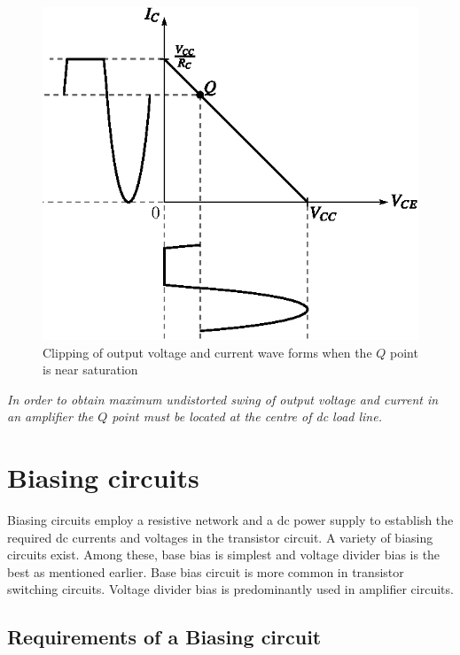 \begin{figure}[H]
\centering
\includegraphics{chap3/fig3.8.eps}
\caption{Clipping of output voltage and current wave forms when the $Q$ point is near saturation}\label{fig4.8}
\end{figure}


{\em In order to obtain maximum undistorted swing of output voltage and current in an amplifier the $Q$ point must be located at the centre of dc load line.}

\section{Biasing circuits}\label{sec4.3}

Biasing circuits employ a resistive network and a dc power supply to establish the required dc currents and voltages in the transistor circuit. A variety of biasing circuits exist. Among these, base bias is simplest and voltage divider bias is the best as mentioned earlier. Base bias circuit is more common in transistor switching circuits. Voltage divider bias is predominantly used in amplifier circuits.

\subsection{Requirements of a Biasing circuit}\label{sec4.3.1}

